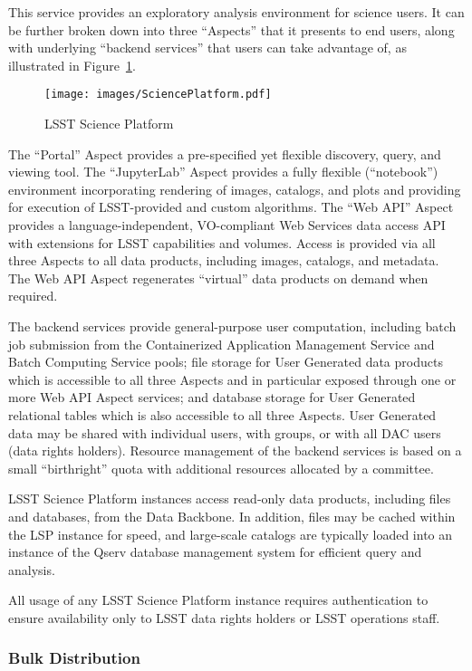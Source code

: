 \documentclass[DM,toc,lsstdraft]{lsstdoc}
\begin{document}
This service provides an exploratory analysis environment for science
users. It can be further broken down into three ``Aspects'' that it
presents to end users, along with underlying ``backend services'' that
users can take advantage of, as illustrated in Figure~\ref{fig:lsp}.

\begin{figure}
\centering
\texttt{[image: images/SciencePlatform.pdf]}
\caption{LSST Science Platform}
\label{fig:lsp}
\end{figure}

The ``Portal'' Aspect provides a pre-specified yet flexible discovery,
query, and viewing tool. The ``JupyterLab'' Aspect provides a fully
flexible (``notebook'') environment incorporating rendering of images,
catalogs, and plots and providing for execution of LSST-provided and
custom algorithms. The ``Web API'' Aspect provides a
language-independent, VO-compliant Web Services data access API with
extensions for LSST capabilities and volumes. Access is provided via all
three Aspects to all data products, including images, catalogs, and
metadata. The Web API Aspect regenerates ``virtual'' data products on
demand when required.

The backend services provide general-purpose user computation, including
batch job submission from the Containerized Application Management Service and Batch Computing Service pools; file storage for User Generated data products which is accessible to all three Aspects and in particular exposed through one or more Web API Aspect services; and database storage for User Generated relational tables which is also accessible to all three Aspects.
User Generated data may be shared with
individual users, with groups, or with all DAC users (data rights
holders). Resource management of the backend services is based on a
small ``birthright'' quota with additional resources allocated by a
committee.

LSST Science Platform instances access read-only data products, including files and databases, from the Data Backbone.
In addition, files may be cached within the LSP instance for speed, and large-scale catalogs are typically loaded into an instance of the Qserv database management system for efficient query and analysis.

All usage of any LSST Science Platform instance requires authentication
to ensure availability only to LSST data rights holders or LSST
operations staff.

\subsubsection{Bulk Distribution}\label{bulk-distribution}
\end{document}
